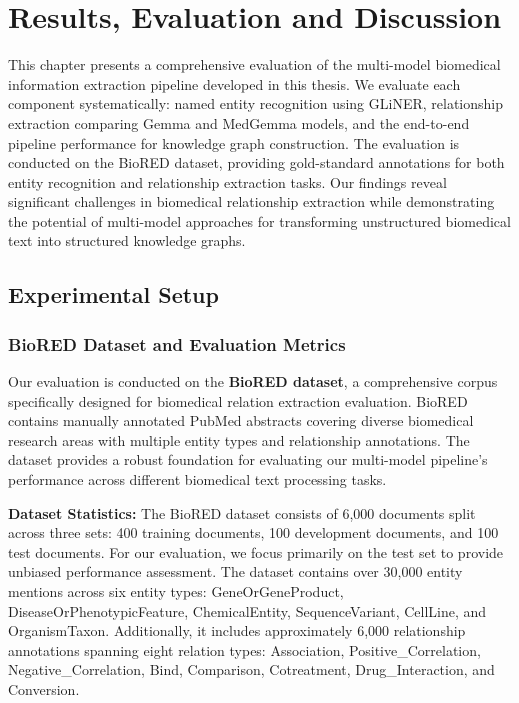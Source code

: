 
\chapter{Results, Evaluation and Discussion} %

\label{Chapter4} %


This chapter presents a comprehensive evaluation of the multi-model biomedical information extraction pipeline developed in this thesis. We evaluate each component systematically: named entity recognition using GLiNER, relationship extraction comparing Gemma and MedGemma models, and the end-to-end pipeline performance for knowledge graph construction. The evaluation is conducted on the BioRED dataset, providing gold-standard annotations for both entity recognition and relationship extraction tasks. Our findings reveal significant challenges in biomedical relationship extraction while demonstrating the potential of multi-model approaches for transforming unstructured biomedical text into structured knowledge graphs.


\section{Experimental Setup}

\subsection{BioRED Dataset and Evaluation Metrics}

Our evaluation is conducted on the \textbf{BioRED dataset}, a comprehensive corpus specifically designed for biomedical relation extraction evaluation. BioRED contains manually annotated PubMed abstracts covering diverse biomedical research areas with multiple entity types and relationship annotations. The dataset provides a robust foundation for evaluating our multi-model pipeline's performance across different biomedical text processing tasks.

\textbf{Dataset Statistics:} The BioRED dataset consists of 6,000 documents split across three sets: 400 training documents, 100 development documents, and 100 test documents. For our evaluation, we focus primarily on the test set to provide unbiased performance assessment. The dataset contains over 30,000 entity mentions across six entity types: GeneOrGeneProduct, DiseaseOrPhenotypicFeature, ChemicalEntity, SequenceVariant, CellLine, and OrganismTaxon. Additionally, it includes approximately 6,000 relationship annotations spanning eight relation types: Association, Positive\_Correlation, Negative\_Correlation, Bind, Comparison, Cotreatment, Drug\_Interaction, and Conversion.

